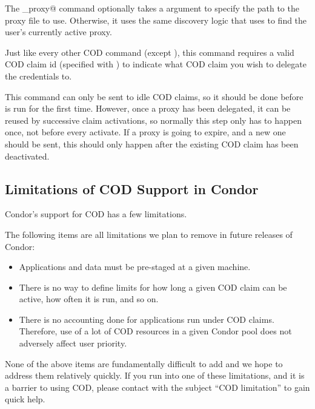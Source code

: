 The \verb@delegate_proxy@ command optionally takes a 
argument to specify the path to the proxy file to use.
Otherwise, it uses the same discovery logic that  uses
to find the user's currently active proxy.

Just like every other COD command (except \verb@request@), this
command requires a valid COD claim id (specified with ) to
indicate what COD claim you wish to delegate the credentials to.

This command can only be sent to idle COD claims, so it should be done
before \verb@activate@ is run for the first time.
However, once a proxy has been delegated, it can be reused by
successive claim activations, so normally this step only has to happen
once, not before every activate.
If a proxy is going to expire, and a new one should be sent, this
should only happen after the existing COD claim has been deactivated.


\subsection{\label{sec:cod-limitations}Limitations of COD Support in Condor}

Condor's support for COD has a few limitations.

The following items are all limitations we plan to remove in future
releases of Condor:

\begin{itemize}

\item Applications and data must be pre-staged at a given machine. 

\item There is no way to define limits for how long a given COD claim
  can be active, how often it is run, and so on.

\item There is no accounting done for applications run under COD
  claims.
  Therefore, use of a lot of COD resources in a given Condor pool
  does not adversely affect user priority.

\end{itemize}

None of the above items are fundamentally difficult to add and we hope
to address them relatively quickly.
If you run into one of these limitations, and it is a barrier to
using COD, please contact  with the
subject ``COD limitation'' to gain quick help.

